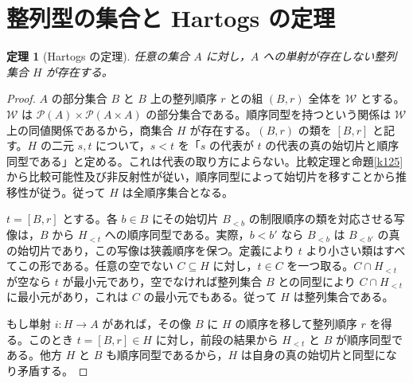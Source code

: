 \documentclass[a5paper,10pt,dvipdfmx]{jsarticle}
\theoremstyle{definition}
\theoremstyle{plain}
\newtheorem{thm}[ruledef]{定理}
\newcommand{\Pow}{\mathcal{P}}
\begin{document}
\section{整列型の集合と Hartogs の定理}
\begin{thm}[Hartogs の定理]\label{k128}
任意の集合 $A$ に対し，$A$ への単射が存在しない整列集合 $H$ が存在する。
\end{thm}
\begin{proof}
$A$ の部分集合 $B$ と $B$ 上の整列順序 $r$ との組 $(B,r)$ 全体を $\mathcal W$ とする。$\mathcal W$ は $\Pow(A)\times\Pow(A\times A)$ の部分集合である。順序同型を持つという関係は $\mathcal W$ 上の同値関係であるから，商集合 $H$ が存在する。$(B,r)$ の類を $[B,r]$ と記す。$H$ の二元 $s,t$ について，$s<t$ を「$s$ の代表が $t$ の代表の真の始切片と順序同型である」と定める。これは代表の取り方によらない。比較定理と命題\ref{k125}から比較可能性及び非反射性が従い，順序同型によって始切片を移すことから推移性が従う。従って $H$ は全順序集合となる。

$t=[B,r]$ とする。各 $b\in B$ にその始切片 $B_{<b}$ の制限順序の類を対応させる写像は，$B$ から $H_{<t}$ への順序同型である。実際，$b<b'$ なら $B_{<b}$ は $B_{<b'}$ の真の始切片であり，この写像は狭義順序を保つ。定義により $t$ より小さい類はすべてこの形である。任意の空でない $C\subseteq H$ に対し，$t\in C$ を一つ取る。$C\cap H_{<t}$ が空なら $t$ が最小元であり，空でなければ整列集合 $B$ との同型により $C\cap H_{<t}$ に最小元があり，これは $C$ の最小元でもある。従って $H$ は整列集合である。

もし単射 $i\colon H\to A$ があれば，その像 $B$ に $H$ の順序を移して整列順序 $r$ を得る。このとき $t=[B,r]\in H$ に対し，前段の結果から $H_{<t}$ と $B$ が順序同型である。他方 $H$ と $B$ も順序同型であるから，$H$ は自身の真の始切片と同型になり矛盾する。
\end{proof}
\end{document}
